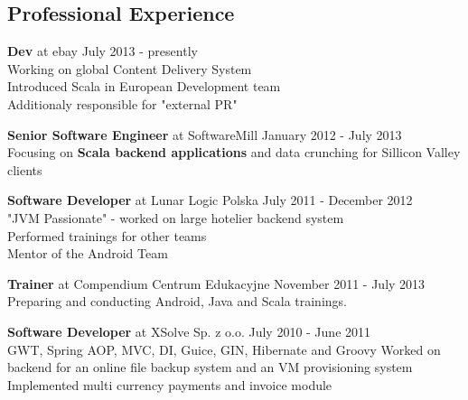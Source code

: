 \documentclass{res}
\begin{document}
 
 
 
\address{{\bf Konrad Malawski} \\
	Vienna -> Kraków -> London\\
	private mobile: +48 602 36 66 55 \\
	}
\address{
	email: konrad.malawski@project13.pl \\
  \textbf{linkedin: linkedin.com/in/konradmalawski} \\
	\textbf{github: github.com/ktoso} \\
	blog: \url{blog.project13.pl} \\
}


\begin{resume} 

\section{Professional Experience}
{\bf Dev} at ebay \hfill July 2013 - presently \\
    Working on global Content Delivery System \\
    Introduced Scala in European Development team \\
    Additionaly responsible for "external PR"

{\bf Senior Software Engineer} at SoftwareMill        \hfill January 2012 - July 2013 \\ 
    Focusing on \textbf{Scala backend applications} and data crunching
    for Sillicon Valley clients 

{\bf Software Developer} at Lunar Logic Polska        \hfill July 2011 - December 2012 \\ 
    "JVM Passionate" - worked on large hotelier backend system \\ 
    Performed trainings for other teams \\
    Mentor of the Android Team

{\bf Trainer} at Compendium Centrum Edukacyjne        \hfill November 2011 - July 2013 \\ 
	Preparing and conducting Android, Java and Scala trainings.
    
{\bf Software Developer} at XSolve Sp. z o.o.         \hfill July 2010 - June 2011\\
	GWT, Spring {AOP, MVC, DI}, Guice, GIN, Hibernate and Groovy
	Worked on backend for an online file backup system and an VM provisioning system
	Implemented multi currency payments and invoice module
    

\end{resume}
\end{document}
